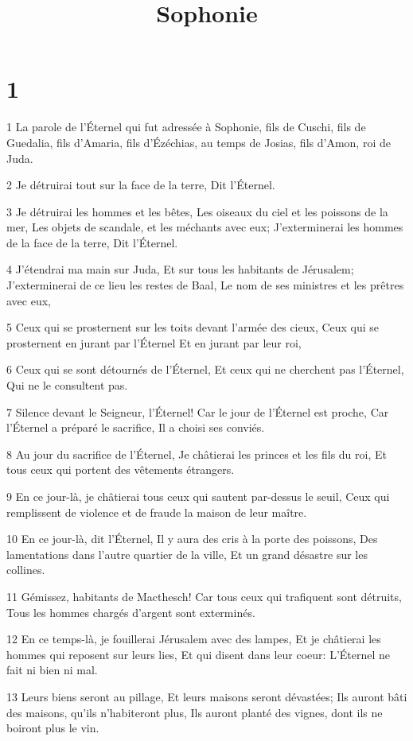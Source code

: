 

\title{Sophonie}


\chapter{1}

\par 1 La parole de l'Éternel qui fut adressée à Sophonie, fils de Cuschi, fils de Guedalia, fils d'Amaria, fils d'Ézéchias, au temps de Josias, fils d'Amon, roi de Juda.
\par 2 Je détruirai tout sur la face de la terre, Dit l'Éternel.
\par 3 Je détruirai les hommes et les bêtes, Les oiseaux du ciel et les poissons de la mer, Les objets de scandale, et les méchants avec eux; J'exterminerai les hommes de la face de la terre, Dit l'Éternel.
\par 4 J'étendrai ma main sur Juda, Et sur tous les habitants de Jérusalem; J'exterminerai de ce lieu les restes de Baal, Le nom de ses ministres et les prêtres avec eux,
\par 5 Ceux qui se prosternent sur les toits devant l'armée des cieux, Ceux qui se prosternent en jurant par l'Éternel Et en jurant par leur roi,
\par 6 Ceux qui se sont détournés de l'Éternel, Et ceux qui ne cherchent pas l'Éternel, Qui ne le consultent pas.
\par 7 Silence devant le Seigneur, l'Éternel! Car le jour de l'Éternel est proche, Car l'Éternel a préparé le sacrifice, Il a choisi ses conviés.
\par 8 Au jour du sacrifice de l'Éternel, Je châtierai les princes et les fils du roi, Et tous ceux qui portent des vêtements étrangers.
\par 9 En ce jour-là, je châtierai tous ceux qui sautent par-dessus le seuil, Ceux qui remplissent de violence et de fraude la maison de leur maître.
\par 10 En ce jour-là, dit l'Éternel, Il y aura des cris à la porte des poissons, Des lamentations dans l'autre quartier de la ville, Et un grand désastre sur les collines.
\par 11 Gémissez, habitants de Macthesch! Car tous ceux qui trafiquent sont détruits, Tous les hommes chargés d'argent sont exterminés.
\par 12 En ce temps-là, je fouillerai Jérusalem avec des lampes, Et je châtierai les hommes qui reposent sur leurs lies, Et qui disent dans leur coeur: L'Éternel ne fait ni bien ni mal.
\par 13 Leurs biens seront au pillage, Et leurs maisons seront dévastées; Ils auront bâti des maisons, qu'ils n'habiteront plus, Ils auront planté des vignes, dont ils ne boiront plus le vin.

